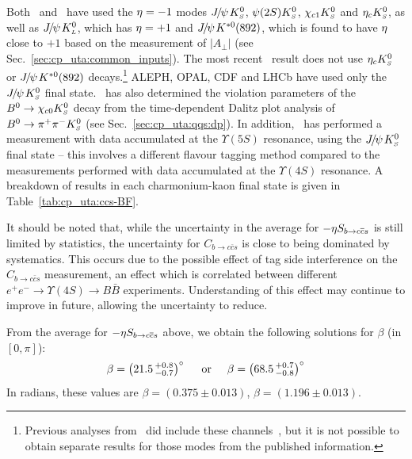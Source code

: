 Both \babar\  and \belle\ have used the ${\eta} = -1$ modes
${J\mskip -3mu/\mskip -2mu\psi\mskip 2mu} K^0_{\scriptscriptstyle S}$, $\psi(2S) K^0_{\scriptscriptstyle S}$, $\chi_{c1} K^0_{\scriptscriptstyle S}$ and $\eta_c K^0_{\scriptscriptstyle S}$, 
as well as ${J\mskip -3mu/\mskip -2mu\psi\mskip 2mu} K^0_{\scriptscriptstyle L}$, which has ${\eta} = +1$
and ${J\mskip -3mu/\mskip -2mu\psi\mskip 2mu} K^{*0}(892)$, which is found to have ${\eta}$ close to $+1$
based on the measurement of $\left| A_\perp \right|$ 
(see Sec.~\ref{sec:cp_uta:common_inputs}).
The most recent \belle\ result does not use $\eta_c K^0_{\scriptscriptstyle S}$ or ${J\mskip -3mu/\mskip -2mu\psi\mskip 2mu} K^{*0}(892)$ decays.\footnote{
  Previous analyses from \belle\ did include these channels~\cite{Abe:2004mz},
  but it is not possible to obtain separate results for those modes from the
  published information.
}
ALEPH, OPAL, CDF and LHCb have used only the ${J\mskip -3mu/\mskip -2mu\psi\mskip 2mu} K^0_{\scriptscriptstyle S}$ final state.
\babar\ has also determined the \CP violation parameters of the
$B^0\to\chi_{c0} K^0_{\scriptscriptstyle S}$ decay from the time-dependent Dalitz plot analysis of
$B^0 \to \pi^+\pi^-K^0_{\scriptscriptstyle S}$ (see Sec.~\ref{sec:cp_uta:qqs:dp}).
In addition, \belle\ has performed a measurement with data accumulated at the $\Upsilon(5S)$ resonance, using the ${J\mskip -3mu/\mskip -2mu\psi\mskip 2mu}K^0_{\scriptscriptstyle S}$ final state -- this involves a different flavour tagging method compared to the measurements performed with data accumulated at the $\Upsilon(4S)$ resonance.
A breakdown of results in each charmonium-kaon final state is given in 
Table~\ref{tab:cp_uta:ccs-BF}.





It should be noted that, while the uncertainty in the average for 
$-\etacp S_{b \to c\bar c s}$ is still limited by statistics,
the uncertainty for $C_{b \to c\bar c s}$ is close to being dominated by systematics.
This occurs due to the possible effect of tag side interference on the
$C_{b \to c\bar c s}$ measurement, an effect which is correlated between
different $e^+e^- \to \Upsilon(4S) \to B\bar{B}$ experiments.
Understanding of this effect may continue to improve in future,
allowing the uncertainty to reduce.

From the average for $-\etacp S_{b \to c\bar c s}$ above, 
we obtain the following solutions for $\beta$
(in $\left[ 0, \pi \right]$):
\begin{equation}
  \beta = \left( 21.5 \,^{+0.8}_{-0.7} \right)^\circ
  \hspace{5mm}
  {\rm or}
  \hspace{5mm}
  \beta = \left( 68.5 \,^{+0.7}_{-0.8} \right)^\circ
  \label{eq:cp_uta:sin2beta}
\end{equation}
In radians, these values are 
$\beta = \left( 0.375 \pm 0.013 \right)$, 
$\beta = \left( 1.196 \pm 0.013 \right)$.


